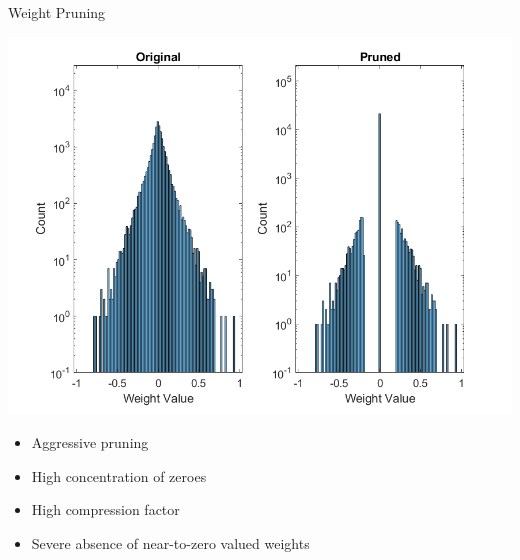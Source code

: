 \begin{frame}{Weight Pruning}
	\begin{minipage}{0.6\textwidth}
		\centering
		\includegraphics[width=\textwidth]{../Images/Weights-distributions/pruned/41.22/weight-distribution-conv1.png}\\
	\end{minipage}%
	\begin{minipage}{0.4\textwidth}
		\begin{itemize}
			\item Aggressive pruning
			\item High concentration of zeroes
			\item High compression factor
			\item Severe absence of near-to-zero valued weights
		\end{itemize}
	\end{minipage}
\end{frame}

